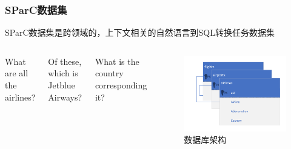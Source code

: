 \documentclass{ctexbeamer}
\begin{document}
\begin{frame}
  \frametitle{SParC数据集}
  SParC数据集是跨领域的，上下文相关的自然语言到SQL转换任务数据集

  \begin{columns}
    What are all the airlines?


    \vspace{0.2cm}
    Of these, which is Jetblue Airways?


    \vspace{0.2cm}
    What is the country corresponding it?


    \begin{figure}
      \includegraphics[width=\textwidth,trim=30 10 10 10,clip]{figure/schema_flight_2.pdf}
      \caption{数据库架构}
    \end{figure}
  \end{columns}
\end{frame}
\end{document}
